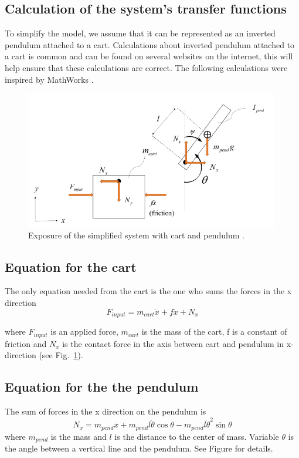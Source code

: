 \begin{appendices}
\section{Calculation of the system's transfer functions} \label{appendix:tf-calculations}
To simplify the model, we assume that it can be represented as an inverted pendulum attached to a cart. Calculations about inverted pendulum attached to a cart is common and can be found on several websites on the internet, this will help ensure
that these calculations are correct. The following calculations were inspired by MathWorks \cite{matlab_inverted_pendulum}.

\begin{figure}[h]
	\centering
	\includegraphics[height=6cm]{assets/FBD-inverted-pendulum.png}
	\caption{\label{fig:fbd}Exposure of the simplified system with cart and pendulum \cite{10193276}.}
\end{figure}


\subsection{Equation for the cart}
The only equation needed from the cart is the one who sums the forces in the x direction
\begin{equation}
F_{input} = m_{cart} \ddot{x} + f \dot{x} + N_x 
\end{equation} 

where \(F_{input}\) is an applied force, \(m_{cart}\) is the mass of the cart, f is a constant of friction and \( N_x \) is the contact force in the axis between cart and pendulum in x-direction (see Fig.~\ref{fig:fbd}).


\subsection{Equation for the the pendulum}
The sum of forces in the x direction on the pendulum is
\begin{equation}
	N_x = m_{pend} \ddot{x} + m_{pend} l \ddot{\theta} \cos \theta - m_{pend} l \dot{\theta}^2 \sin \theta \label{eq:force_x}
\end{equation}
where $m_{pend}$ is the mass and $l$ is the distance to the center of mass. Variable $\theta$ is the angle between a vertical line and the pendulum. See Figure for details.


\end{appendices}
